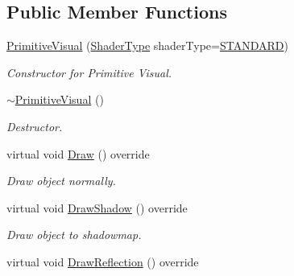 \subsection*{Public Member Functions}
\begin{DoxyCompactItemize}
\item 
\mbox{\hyperlink{class_primitive_visual_a8198e82c2dc99af36b96a2ad35ec36aa}{Primitive\+Visual}} (\mbox{\hyperlink{_game_object_8h_a6230e1b9ecbf2d82d10856fd7e1fde46}{Shader\+Type}} shader\+Type=\mbox{\hyperlink{_texture_8h_a65468556d79304b3a4bfc464cc12e549a94e94133f4bdc1794c6b647b8ea134d0}{S\+T\+A\+N\+D\+A\+RD}})
\begin{DoxyCompactList}\small\item\em Constructor for Primitive Visual. \end{DoxyCompactList}\item 
\mbox{\hyperlink{class_primitive_visual_a2d1ca03da960111c6cce0852e02b10f6}{$\sim$\+Primitive\+Visual}} ()
\begin{DoxyCompactList}\small\item\em Destructor. \end{DoxyCompactList}\item 
virtual void \mbox{\hyperlink{class_primitive_visual_a9ce21acf4bb9b9d9ac24c75f6aa9aec3}{Draw}} () override
\begin{DoxyCompactList}\small\item\em Draw object normally. \end{DoxyCompactList}\item 
virtual void \mbox{\hyperlink{class_primitive_visual_a67915de082572ca4f6467c1402587024}{Draw\+Shadow}} () override
\begin{DoxyCompactList}\small\item\em Draw object to shadowmap. \end{DoxyCompactList}\item 
virtual void \mbox{\hyperlink{class_primitive_visual_a474e31c4bcf99e49da2ea943d6f25746}{Draw\+Reflection}} () override
\end{DoxyCompactItemize}
